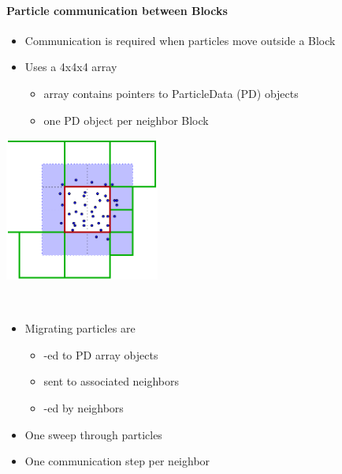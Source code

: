 %
%
%
%

\begin{frame}[fragile] 
  \secframetitle{\ssRecentParticles}
  \framesubtitle{Particle communication between Blocks}
\begin{itemize}
\item Communication is required when particles move outside a Block 
\item Uses a 4x4x4 array
\begin{itemize}
\item array contains pointers to ParticleData (PD) objects
\item one PD object per neighbor Block
\end{itemize}

\end{itemize}
\begin{minipage}{1.8in}
\includegraphics[width=2.0in]{particle-refresh-2.pdf}
\end{minipage} \ 
\begin{minipage}{2.7in}
\begin{itemize}
\item Migrating particles are
\begin{itemize}
\item {}-ed to PD array objects
\item sent to associated neighbors
\item {}-ed by neighbors
\end{itemize}
\item One sweep through particles
\item One communication step per neighbor
\end{itemize}
\end{minipage}
\end{frame}

